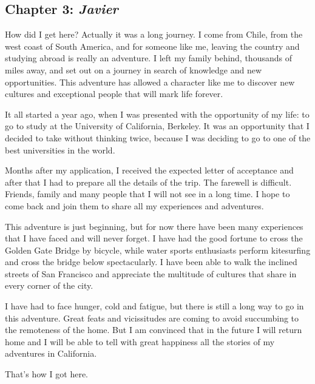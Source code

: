 \documentclass{article}
\begin{document}
\subsection*{Chapter 3: \textit{Javier}}

How did I get here? Actually it was a long journey. I come from Chile, from the west coast of South America, and for someone like me, leaving the country and studying abroad is really an adventure. I left my family behind, thousands of miles away, and set out on a journey in search of knowledge and new opportunities. This adventure has allowed a character like me to discover new cultures and exceptional people that will mark life forever.

It all started a year ago, when I was presented with the opportunity of my life: to go to study at the University of California, Berkeley. It was an opportunity that I decided to take without thinking twice, because I was deciding to go to one of the best universities in the world.

Months after my application, I received the expected letter of acceptance and after that I had to prepare all the details of the trip. The farewell is difficult. Friends, family and many people that I will not see in a long time. I hope to come back and join them to share all my experiences and adventures.

This adventure is just beginning, but for now there have been many experiences that I have faced and will never forget. I have had the good fortune to cross the Golden Gate Bridge by bicycle, while water sports enthusiasts perform kitesurfing and cross the bridge below spectacularly. I have been able to walk the inclined streets of San Francisco and appreciate the multitude of cultures that share in every corner of the city.

I have had to face hunger, cold and fatigue, but there is still a long way to go in this adventure. Great feats and vicissitudes are coming to avoid succumbing to the remoteness of the home. But I am convinced that in the future I will return home and I will be able to tell with great happiness all the stories of my adventures in California.

That's how I got here.
\end{document}
